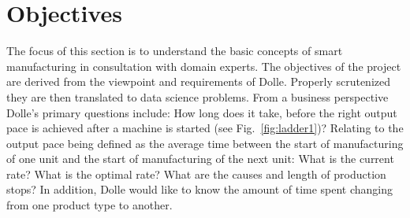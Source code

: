 \documentclass[runningheads]{llncs}
\begin{document}
\section{Objectives}
\label{sec:businessunderstanding}
\iffalse
\begin{wrapfigure}{r}{0.4\textwidth}
  \begin{center}
    \texttt{[image: machine1]}
  \end{center}
  \vspace{-3mm}
  \caption{Three-section timber loft ladder at Dolle's assembly line}
  \label{fig:ladder1}
\end{wrapfigure}
\fi

\iffalse
The focus of this section is to understand the basic concepts of smart manufacturing in consultation with domain experts. Project objectives are derived from the viewpoint of Dolle requirements and subsequently converted into data science problem definitions. Some of Dolle's primary objectives, from a business perspective are described as follow. When machines are started, Dolle would like to know how long it takes, before the right output pace with regards to the product (ladder) manufactured is achieved (see Fig.~\ref{fig:ladder1}). Output rate is the average time between the start of production of one unit and the start of production of the next unit. How fast are items moving through the machines? What is optimal rate? In addition, What are the causes of production disruption? Dolle would also like to know how much time is spent on changeovers (product types). A business goal states objectives in business terms, whereas, a data mining goal states objectives in technical terms. A non-exhaustive list of data mining goals:
\fi
The focus of this section is to understand the basic concepts of smart manufacturing in consultation with domain experts. The objectives of the project are derived from the viewpoint and requirements of Dolle. Properly scrutenized they are then translated to data science problems. From a business perspective Dolle's primary questions include: How long does it take, before the right output pace is achieved after a machine is started (see Fig.~\ref{fig:ladder1})? Relating to the output pace being defined as the average time between the start of manufacturing of one unit and the start of manufacturing of the next unit: What is the current rate? What is the optimal rate? What are the causes and length of production stops? In addition, Dolle would like to know the amount of time spent changing from one product type to another.  
\end{document}
